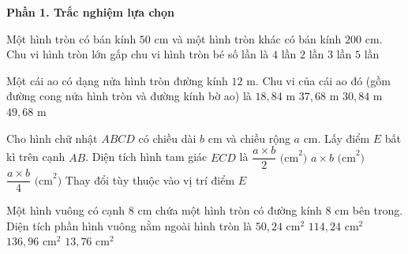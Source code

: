 \textbf{Phần 1. Trắc nghiệm lựa chọn}

\begin{ex} %
Một hình tròn có bán kính $50\text{ cm}$ và một hình tròn khác có bán kính $200\text{ cm}$. Chu vi hình tròn lớn gấp chu vi hình tròn bé số lần là
\choice
{\True $4$ lần}
{$2$ lần}
{$3$ lần}
{$5$ lần}
\end{ex}

\begin{ex} %
Một cái ao có dạng nửa hình tròn đường kính $12\text{ m}$. Chu vi của cái ao đó (gồm đường cong nửa hình tròn và đường kính bờ ao) là
\choice
{$18{,}84\text{ m}$}
{$37{,}68\text{ m}$}
{\True $30{,}84\text{ m}$}
{$49{,}68\text{ m}$}
\end{ex}

\begin{ex} %
Cho hình chữ nhật $ABCD$ có chiều dài $b\text{ cm}$ và chiều rộng $a\text{ cm}$. Lấy điểm $E$ bất kì trên cạnh $AB$. Diện tích hình tam giác $ECD$ là
\choice
{\True $\dfrac{a \times b}{2}\text{ (cm}^2\text{)}$}
{$a \times b\text{ (cm}^2\text{)}$}
{$\dfrac{a \times b}{4}\text{ (cm}^2\text{)}$}
{Thay đổi tùy thuộc vào vị trí điểm $E$}
\end{ex}

\begin{ex} %
Một hình vuông có cạnh $8\text{ cm}$ chứa một hình tròn có đường kính $8\text{ cm}$ bên trong. Diện tích phần hình vuông nằm ngoài hình tròn là
\choice
{$50{,}24\text{ cm}^2$}
{$114{,}24\text{ cm}^2$}
{$136{,}96\text{ cm}^2$}
{\True $13{,}76\text{ cm}^2$}
\end{ex}

